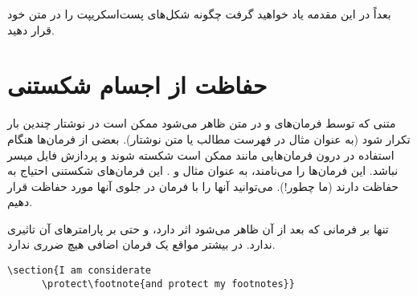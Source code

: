 بعداً در این مقدمه یاد خواهید گرفت چگونه شکل‌های پست‌اسکریپت را در متن خود قرار دهید.
\section{حفاظت از اجسام شکستنی}
متنی که توسط فرمان‌های 
 و 
در متن ظاهر می‌شود ممکن است در نوشتار چندین بار تکرار شود (به عنوان مثال در فهرست مطالب یا متن نوشتار). بعضی از فرمان‌ها هنگام استفاده در درون فرمان‌هایی مانند 
ممکن است شکسته شوند و پردازش فایل میسر نباشد. این فرمان‌ها را 
می‌نامند، به عنوان مثال 
 و .
این فرمان‌های شکستنی احتیاج به حفاظت دارند (ما چطور!). می‌توانید آنها را با فرمان 
در جلوی آنها مورد حفاظت قرار دهیم.

تنها بر فرمانی که بعد از آن ظاهر می‌شود اثر دارد، و حتی بر پارامترهای آن تاثیری ندارد. در بیشتر مواقع یک فرمان اضافی 
هیچ ضرری ندارد.

\begin{code}
\verb|\section{I am considerate|\\
\verb|      \protect\footnote{and protect my footnotes}}|
\end{code}


